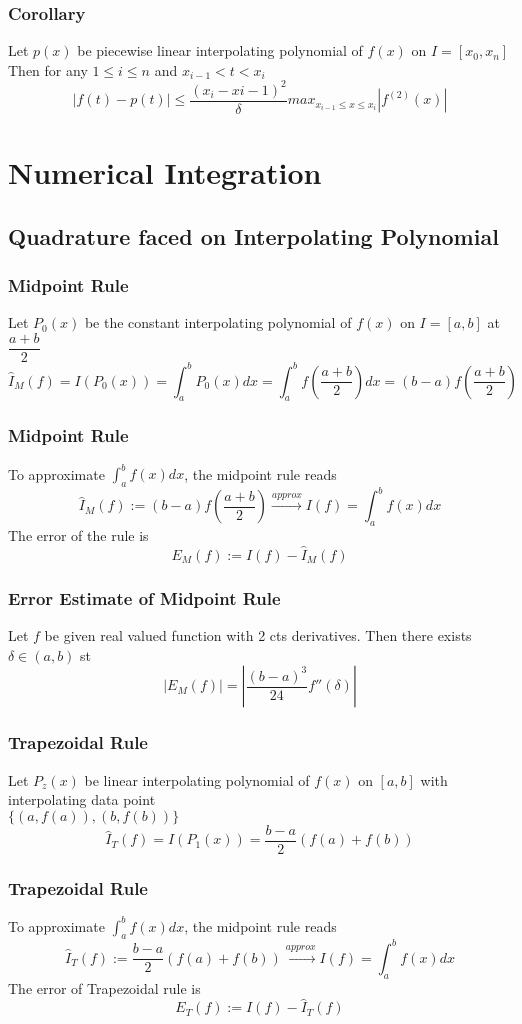 \documentclass[11pt]{article}
\newcommand{\ds}{\displaystyle}
\begin{document}
\subsubsection*{Corollary}
Let $p(x)$ be piecewise linear interpolating polynomial of $f(x)$ on $I=[x_0,x_n]$ \\
Then for any $1\leq i\leq n$ and $x_{i-1}< t< x_i$
\[|f(t)-p(t)| \leq \frac{(x_i-x{i-1})^2}{\delta}max_{x_{i-1}\leq x\leq x_i}|f^{(2)}(x)|\]


\section{Numerical Integration}
\subsection{Quadrature faced on Interpolating Polynomial}
\subsubsection{Midpoint Rule}
Let $P_0(x)$ be the constant interpolating polynomial of $f(x)$ on $I=[a,b]$ at $\dfrac{a+b}{2}$ 
\[\hat{I}_M(f) = I(P_0(x)) = \int_{a}^{b}P_0(x)dx = \int_{a}^{b}f(\frac{a+b}{2})dx = (b-a)f(\frac{a+b}{2})\]
\subsubsection*{Midpoint Rule}
To approximate $\ds\int_{a}^{b}f(x)dx$, the midpoint rule reads
\[\hat{I}_M(f):= (b-a)f(\frac{a+b}{2})\xrightarrow[]{approx}I(f)=\int_{a}^{b}f(x)dx\]
The error of the rule is 
\[E_M(f):= I(f) - \hat{I}_M(f)\]
\subsubsection*{Error Estimate of Midpoint Rule}
Let $f$ be given real valued function with 2 cts derivatives. Then there exists $\delta\in(a,b)$ st 
\[|E_M(f)| = |\dfrac{(b-a)^3}{24}f''(\delta)|\]
\subsubsection{Trapezoidal Rule}
Let $P_z(x)$ be linear interpolating polynomial of $f(x)$ on $[a,b]$ with interpolating data point \\
$\{(a,f(a)),(b,f(b))\}$
\[\hat{I}_T(f)=I(P_1(x)) = \frac{b-a}{2}(f(a)+f(b))\]
\subsubsection*{Trapezoidal Rule}
To approximate $\ds\int_{a}^{b}f(x)dx$, the midpoint rule reads
\[\hat{I}_T(f):= \frac{b-a}{2}(f(a)+f(b))\xrightarrow[]{approx}I(f)=\int_{a}^{b}f(x)dx\]
The error of Trapezoidal rule is 
\[E_T(f):=I(f)-\hat{I}_T(f)\]
\end{document}
